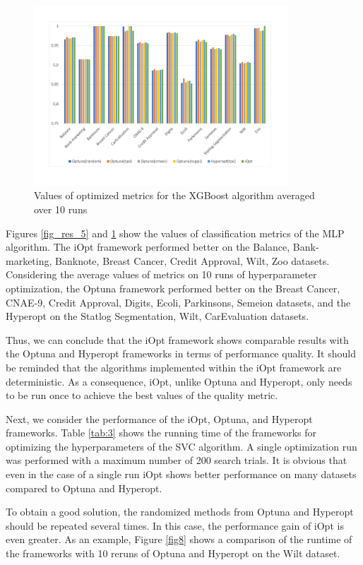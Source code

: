 \documentclass[preprint,12pt]{elsarticle}
\begin{document}
\begin{figure}
\centering
\includegraphics[width=0.85\textwidth]{MLP_2_avg.pdf}
\caption{Values of optimized metrics for the XGBoost algorithm averaged over 10 runs} \label{fig_res_6}
\end{figure}

Figures \ref{fig_res_5} and \ref{fig_res_6} show the values of classification metrics of the MLP algorithm. The iOpt framework performed better on the Balance, Bank-marketing, Banknote, Breast Cancer, Credit Approval, Wilt, Zoo datasets. Considering the average values of metrics on 10 runs of hyperparameter optimization, the Optuna framework performed better on the Breast Cancer, CNAE-9, Credit Approval, Digits, Ecoli, Parkinsons, Semeion datasets, and the Hyperopt on the Statlog Segmentation, Wilt, CarEvaluation datasets.


Thus, we can conclude that the iOpt framework shows comparable results with the Optuna and Hyperopt frameworks in terms of performance quality. It should be reminded that the algorithms implemented within the iOpt framework are deterministic. As a consequence, iOpt, unlike Optuna and Hyperopt, only needs to be run once to achieve the best values of the quality metric.

Next, we consider the performance of the iOpt, Optuna, and Hyperopt frameworks. Table \ref{tab:3} shows the running time of the frameworks for optimizing the hyperparameters of the SVC algorithm.  A single optimization run was performed with a maximum number of 200 search trials. It is obvious that even in the case of a single run iOpt shows better performance on many datasets compared to Optuna and Hyperopt.

To obtain a good solution, the randomized methods from Optuna and Hyperopt should be repeated several times. In this case, the performance gain of iOpt is even greater. As an example, Figure \ref{fig8} shows a comparison of the runtime of the frameworks with 10 reruns of Optuna and Hyperopt on the Wilt dataset.
\end{document}
